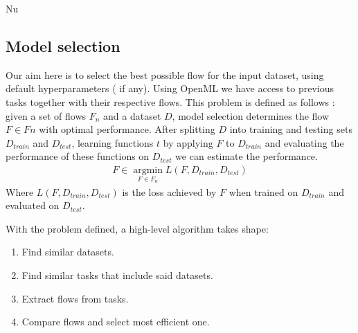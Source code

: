 Nu\documentclass[11pt,twoside, a4paper]{report}
\begin{document}
\subsection{Model selection}

Our aim here is to select the best possible flow for the input dataset, using default hyperparameters (
if any). Using OpenML we have access to previous tasks together with their respective flows. This problem is defined as follows \parencite{Thornton2013}: given a set of flows $F_n$ and a dataset $D$, model selection determines the flow $F \in Fn$ with optimal performance. After splitting $D$ into training and testing sets $D_{train}$ and $D_{test}$, learning functions $t$ by applying $F$ to $D_{train}$ and evaluating the performance of these functions on $D_{test}$ we can estimate the performance. 
\begin{align*}
    F \in \operatorname*{argmin}_{F \in F_n} L(F, D_{train}, D_{test}) 
\end{align*}
Where $L(F, D_{train}, D_{test})$ is the loss achieved by $F$ when trained on $D_{train}$ and evaluated on $D_{test}$.

With the problem defined, a high-level algorithm takes shape:
\begin{enumerate}
    \item Find similar datasets.
    \item Find similar tasks that include said datasets.
    \item Extract flows from tasks.
    \item Compare flows and select most efficient one.
\end{enumerate}
\end{document}
